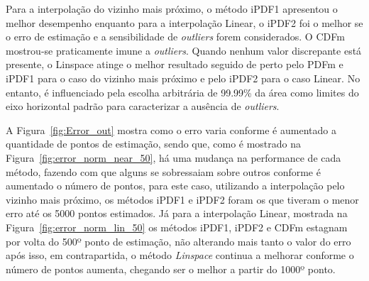 Para a interpolação do vizinho mais próximo, o método \ac{iPDF1} apresentou o melhor desempenho enquanto para a interpolação Linear, o \ac{iPDF2} foi o melhor se o erro de estimação e a sensibilidade de \textit{outliers} forem considerados. O \ac{CDFm} mostrou-se praticamente imune a \textit{outliers}. Quando nenhum valor discrepante está presente, o Linspace atinge o melhor resultado seguido de perto pelo \ac{PDFm} e \ac{iPDF1} para o caso do vizinho mais próximo e pelo \ac{iPDF2} para o caso Linear. No entanto, é influenciado pela escolha arbitrária de 99.99\% da área como limites do eixo horizontal padrão para caracterizar a ausência de \textit{outliers}. 

A Figura~\ref{fig:Error_out} mostra como o erro varia conforme é aumentado a quantidade de pontos de estimação, sendo que, como é mostrado na Figura~\ref{fig:error_norm_near_50}, há uma mudança na performance de cada método, fazendo com que alguns se sobressaiam sobre outros conforme é aumentado o número de pontos, para este caso, utilizando a interpolação pelo vizinho mais próximo, os métodos \ac{iPDF1} e \ac{iPDF2} foram os que tiveram o menor erro até os 5000 pontos estimados. Já para a interpolação Linear, mostrada na Figura~\ref{fig:error_norm_lin_50} os métodos \ac{iPDF1}, \ac{iPDF2} e \ac{CDFm} estagnam por volta do 500º ponto de estimação, não alterando mais tanto o valor do erro após isso, em contrapartida, o método \textit{Linspace} continua a melhorar conforme o número de pontos aumenta, chegando ser o melhor a partir do 1000º ponto.


